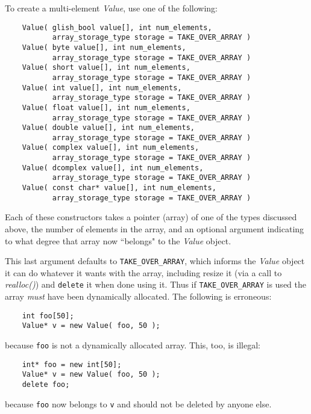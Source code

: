 To create a multi-element {\em Value\/}, use one of the following:
\begin{verbatim}
    Value( glish_bool value[], int num_elements,
           array_storage_type storage = TAKE_OVER_ARRAY )
    Value( byte value[], int num_elements,
           array_storage_type storage = TAKE_OVER_ARRAY )
    Value( short value[], int num_elements,
           array_storage_type storage = TAKE_OVER_ARRAY )
    Value( int value[], int num_elements,
           array_storage_type storage = TAKE_OVER_ARRAY )
    Value( float value[], int num_elements,
           array_storage_type storage = TAKE_OVER_ARRAY )
    Value( double value[], int num_elements,
           array_storage_type storage = TAKE_OVER_ARRAY )
    Value( complex value[], int num_elements,
           array_storage_type storage = TAKE_OVER_ARRAY )
    Value( dcomplex value[], int num_elements,
           array_storage_type storage = TAKE_OVER_ARRAY )
    Value( const char* value[], int num_elements,
           array_storage_type storage = TAKE_OVER_ARRAY )
\end{verbatim}
Each of these constructors takes a pointer (array) of one of the types
discussed above, the number of elements in the array, and an optional
argument indicating to what degree that array now ``belongs" to the
{\em Value} object.

This last argument defaults to {\tt TAKE\_OVER\_ARRAY}, which informs the
{\em Value} object it can do whatever it wants  with the array,
including resize it (via a call to {\em realloc()})
and {\tt delete} it
when done using it.  Thus if {\tt TAKE\_OVER\_ARRAY} is used the array {\em
must} have been dynamically allocated.  The following is erroneous:
\begin{verbatim}
    int foo[50];
    Value* v = new Value( foo, 50 );
\end{verbatim}
because {\tt foo} is not a dynamically allocated array.  This, too,
is illegal:
\begin{verbatim}
    int* foo = new int[50];
    Value* v = new Value( foo, 50 );
    delete foo;
\end{verbatim}
because {\tt foo} now belongs to {\tt v} and should not be deleted
by anyone else.


